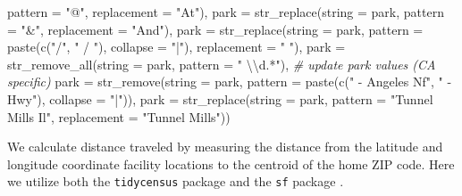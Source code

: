 \documentclass[
  11 pt,
  openany]{book}
\newenvironment{Shaded}{\begin{snugshade}}{\end{snugshade}}
\newcommand{\AttributeTok}[1]{\textcolor[rgb]{0.77,0.63,0.00}{#1}}
\newcommand{\CommentTok}[1]{\textcolor[rgb]{0.56,0.35,0.01}{\textit{#1}}}
\newcommand{\FunctionTok}[1]{\textcolor[rgb]{0.00,0.00,0.00}{#1}}
\newcommand{\NormalTok}[1]{#1}
\newcommand{\SpecialCharTok}[1]{\textcolor[rgb]{0.00,0.00,0.00}{#1}}
\newcommand{\StringTok}[1]{\textcolor[rgb]{0.31,0.60,0.02}{#1}}
\begin{document}
\begin{Shaded}
\begin{Highlighting}[]
                       \AttributeTok{pattern =} \StringTok{"@"}\NormalTok{,}
                       \AttributeTok{replacement =} \StringTok{"At"}\NormalTok{),}
    \AttributeTok{park =} \FunctionTok{str\_replace}\NormalTok{(}\AttributeTok{string =}\NormalTok{ park,}
                       \AttributeTok{pattern =} \StringTok{"\&"}\NormalTok{,}
                       \AttributeTok{replacement =} \StringTok{"And"}\NormalTok{),}
    \AttributeTok{park =} \FunctionTok{str\_replace}\NormalTok{(}\AttributeTok{string =}\NormalTok{ park,}
                       \AttributeTok{pattern =} \FunctionTok{paste}\NormalTok{(}\FunctionTok{c}\NormalTok{(}\StringTok{"/"}\NormalTok{, }\StringTok{" / "}\NormalTok{), }\AttributeTok{collapse =} \StringTok{"|"}\NormalTok{),}
                       \AttributeTok{replacement =} \StringTok{" "}\NormalTok{),}
    \AttributeTok{park =} \FunctionTok{str\_remove\_all}\NormalTok{(}\AttributeTok{string =}\NormalTok{ park,}
                          \AttributeTok{pattern =} \StringTok{" }\SpecialCharTok{\textbackslash{}\textbackslash{}}\StringTok{d.*"}\NormalTok{),}
    \CommentTok{\# update park values (CA specific)}
    \AttributeTok{park =} \FunctionTok{str\_remove}\NormalTok{(}\AttributeTok{string =}\NormalTok{ park,}
                      \AttributeTok{pattern =} \FunctionTok{paste}\NormalTok{(}\FunctionTok{c}\NormalTok{(}\StringTok{" {-} Angeles Nf"}\NormalTok{, }\StringTok{" {-}Hwy"}\NormalTok{), }
                                      \AttributeTok{collapse =} \StringTok{"|"}\NormalTok{)),}
    \AttributeTok{park =} \FunctionTok{str\_replace}\NormalTok{(}\AttributeTok{string =}\NormalTok{ park,}
                       \AttributeTok{pattern =} \StringTok{"Tunnel Mills Il"}\NormalTok{,}
                       \AttributeTok{replacement =} \StringTok{"Tunnel Mills"}\NormalTok{))}
\end{Highlighting}
\end{Shaded}

We calculate distance traveled by measuring the distance from the latitude and longitude coordinate facility locations to the centroid of the home ZIP code. Here we utilize both the \texttt{tidycensus} package \citep{R-tidycensus} and the \texttt{sf} package \citep{R-sf}.
\end{document}
